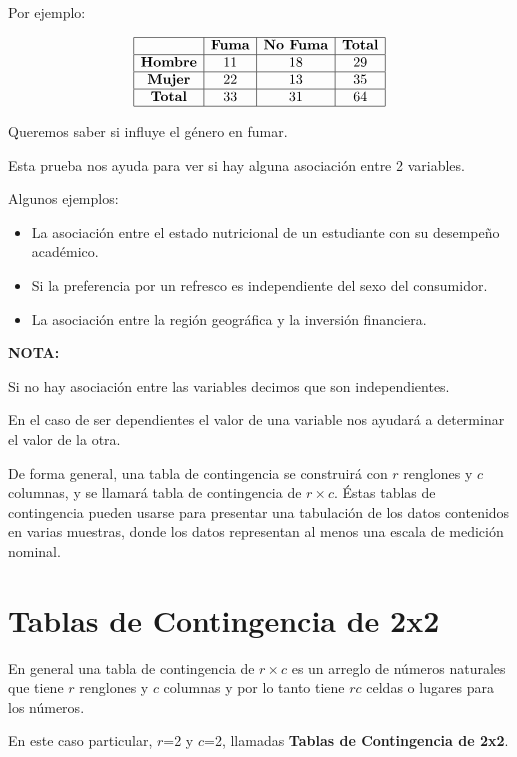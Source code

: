 \documentclass[
  a4paper,
  oneside,
  openany]{book}
\begin{document}
Por ejemplo:

\[
\begin{array}{|c|c|c|c|} 
\hline
&\textbf{Fuma} &\textbf{No Fuma} &\textbf{Total}\\
\hline
\textbf{Hombre} &11 &18 &29\\
\hline
\textbf{Mujer} &22 &13 &35\\
\hline
\textbf{Total}& 33& 31 &64\\
\hline
\end{array}
\]

Queremos saber si influye el género en fumar.

Esta prueba nos ayuda para ver si hay alguna asociación entre 2 variables.

Algunos ejemplos:

\begin{itemize}
\item
  La asociación entre el estado nutricional de un estudiante con su desempeño académico.
\item
  Si la preferencia por un refresco es independiente del sexo del consumidor.
\item
  La asociación entre la región geográfica y la inversión financiera.
\end{itemize}

\textbf{NOTA:}

Si no hay asociación entre las variables decimos que son independientes.

En el caso de ser dependientes el valor de una variable nos ayudará a determinar el valor de la otra.

De forma general, una tabla de contingencia se construirá con \(r\) renglones y \(c\) columnas, y se llamará tabla de contingencia de \(r\times c\). Éstas tablas de contingencia pueden usarse para presentar una tabulación de los datos contenidos en varias muestras, donde los datos representan al menos una escala de medición nominal.

\hypertarget{tablas-de-contingencia-de-2x2}{%
\chapter{Tablas de Contingencia de 2x2}\label{tablas-de-contingencia-de-2x2}}

En general una tabla de contingencia de \(r \times c\) es un arreglo de números naturales que tiene \(r\) renglones y \(c\) columnas y por lo tanto tiene \(rc\) celdas o lugares para los números.

En este caso particular, \(r\)=2 y \(c\)=2, llamadas \textbf{Tablas de Contingencia de 2x2}.
\end{document}
